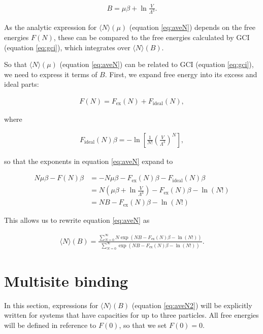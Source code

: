 \documentclass[10pt,a4paper]{article}
\begin{document}
\begin{align}
B = \mu\beta + \ln\frac{V}{\Lambda^3}.
\end{align}

As the analytic expression for $\langle N \rangle(\mu)$ (equation \ref{eq:aveN}) depends on the free energies $F(N)$, these can be compared to the free energies calculated by GCI (equation \ref{eq:gci}), which integrates over $\langle N \rangle(B)$.

So that $\langle N \rangle(\mu)$ (equation \ref{eq:aveN}) can be related to GCI (equation \ref{eq:gci}), we need to express it terms of $B$. First, we expand free energy into its excess and ideal parts:

\begin{align}
F(N) = F_\text{ex}(N) + F_\text{ideal}(N),
\end{align}

where 

\begin{align}
F_\text{ideal}(N)\beta = -\ln\left[\frac{1}{N!}\left(\frac{V}{\Lambda^3}\right)^N\right],
\end{align}

so that the exponents in equation \ref{eq:aveN} expand to

\begin{align*}
N\mu\beta - F(N)\beta  &= -N\mu\beta -  F_\text{ex}(N)\beta - F_\text{ideal}(N)\beta \\
&= N(\mu\beta + \ln\frac{V}{\Lambda^3}) - F_\text{ex}(N)\beta  - \ln(N!) \\
&= NB - F_\text{ex}(N)\beta  - \ln(N!)
\end{align*}

This allows us to rewrite equation \ref{eq:aveN} as 

\begin{align}
\langle N \rangle(B) = \frac{\sum_{N=0}^\infty N\exp(NB - F_\text{ex}(N)\beta  - \ln(N!))}{\sum_{N=0}^\infty \exp(NB - F_\text{ex}(N)\beta  - \ln(N!))}.
\label{eq:aveN2}
\end{align}

\section{Multisite binding}
In this section, expressions for $\langle N \rangle(B)$ (equation \ref{eq:aveN2}) will be explicitly written for systems that have capacities for up to three particles. All free energies will be defined in reference to $F(0)$, so that we set $F(0)=0$.
\end{document}
